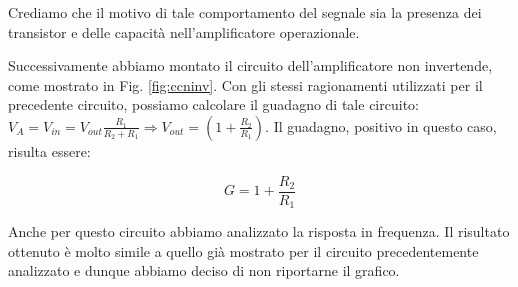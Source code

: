 
Crediamo che il motivo di tale comportamento %
del segnale sia la presenza dei transistor e delle capacità nell'amplificatore operazionale.

Successivamente abbiamo montato il circuito dell'amplificatore non invertende, come mostrato in Fig. \ref{fig:ccninv}. Con gli stessi ragionamenti utilizzati per il precedente circuito, possiamo calcolare il guadagno di tale circuito: $V_A=V_{in}=V_{out}\frac{R_1}{R_2+R_1} \Rightarrow V_{out}=(1+\frac{R_2}{R_1})$. Il guadagno, positivo in questo caso, risulta essere: 

\begin{equation}
G=1+\frac{R_2}{R_1}
\end{equation}

Anche per questo circuito abbiamo analizzato la risposta in frequenza.
Il risultato ottenuto è molto simile a quello già mostrato per il circuito precedentemente analizzato e dunque abbiamo deciso di non riportarne il grafico.
